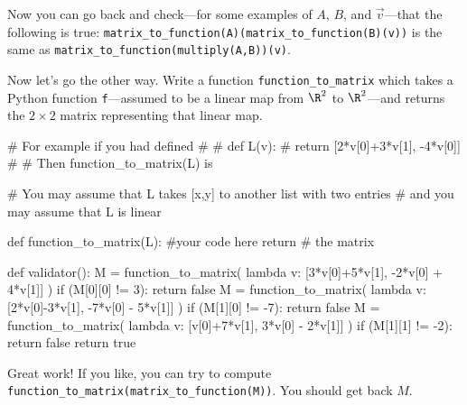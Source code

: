 \documentclass{ximera}
\begin{document}
\begin{exercise}
Now you can go back and check---for some examples of $A$, $B$, and $\vec{v}$---that the following is true:
\verb|matrix_to_function(A)(matrix_to_function(B)(v))| is the same as \verb|matrix_to_function(multiply(A,B))(v)|.

\begin{solution}
  Now let's go the other way.  Write a function
  \verb|function_to_matrix| which takes a Python function
  \verb|f|---assumed to be a linear map from $\R^2$ to $\R^2$---and
  returns the $2 \times 2$ matrix representing that linear map.

\begin{python}
# For example if you had defined
# 
# def L(v):
#   return [2*v[0]+3*v[1], -4*v[0]]
#
# Then function_to_matrix(L) is 
		
# You may assume that L takes [x,y] to another list with two entries
# and you may assume that L is linear

def function_to_matrix(L):
  #your code here
  return # the matrix

def validator():
  M = function_to_matrix( lambda v: [3*v[0]+5*v[1], -2*v[0] + 4*v[1]] )
  if (M[0][0] != 3):
    return false
  M = function_to_matrix( lambda v: [2*v[0]-3*v[1], -7*v[0] - 5*v[1]] )
  if (M[1][0] != -7):
    return false
  M = function_to_matrix( lambda v: [v[0]+7*v[1], 3*v[0] - 2*v[1]] )
  if (M[1][1] != -2):
    return false
  return true
\end{python}
\end{solution}

Great work!  If you like, you can try to compute \verb|function_to_matrix(matrix_to_function(M))|.  You should get back $M$.
\end{exercise}
\end{document}
